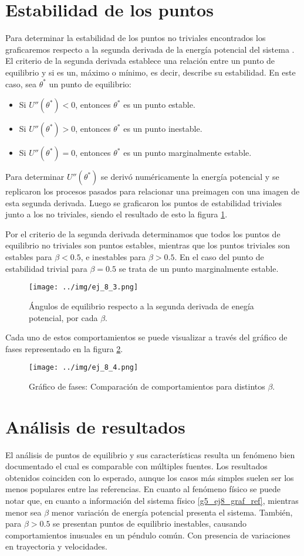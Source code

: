 \documentclass[../portafolio.tex]{subfiles}
\begin{document}
\section{Estabilidad de los puntos}
Para determinar la estabilidad de los puntos no triviales encontrados los graficaremos respecto a la segunda derivada de la energía potencial del sistema \citep{chasnov_diferenciales_2024}. 
El criterio de la segunda derivada establece una relación entre un punto de equilibrio y si es un, máximo o mínimo, es decir, describe su estabilidad. En este caso, sea $\theta^*$ un punto de equilibrio: 
\begin{itemize}
\item Si $U''(\theta^*)<0$, entonces $\theta^*$ es un punto estable. 
\item Si $U''(\theta^*)>0$, entonces $\theta^*$ es un punto inestable.
\item Si $U''(\theta^*)=0$, entonces $\theta^*$ es un punto marginalmente estable.
\end{itemize}
Para determinar $U''(\theta^*)$ se derivó numéricamente la energía potencial y se replicaron los procesos pasados para relacionar una preimagen con una imagen de esta segunda derivada.
Luego se graficaron los puntos de estabilidad triviales junto a los no triviales, siendo el resultado de esto la figura \ref{g5_ej8_graf3}.

Por el criterio de la segunda derivada determinamos que todos los puntos de equilibrio no triviales son puntos estables, mientras que los puntos triviales son estables para $\beta <0.5$, e inestables para $\beta > 0.5$. En el caso del punto de estabilidad trivial para $\beta =0.5$ se trata de un punto marginalmente estable.
\begin{figure}
\centering
\texttt{[image: ../img/ej\_8\_3.png]}
\caption{Ángulos de equilibrio respecto a la segunda derivada de enegía potencial, por cada $\beta$.} \label{g5_ej8_graf3}
\end{figure}
Cada uno de estos comportamientos se puede visualizar a través del gráfico de fases representado en la figura \ref{g5_ej8_graf4}.
\begin{figure}
\centering
\texttt{[image: ../img/ej\_8\_4.png]}
\caption{Gráfico de fases: Comparación de comportamientos para distintos $\beta$.} \label{g5_ej8_graf4}
\end{figure}
\section{Análisis de resultados}
El análisis de puntos de equilibrio y sus características resulta un fenómeno bien documentado el cual es comparable con múltiples fuentes. Los resultados obtenidos coinciden con lo esperado, aunque los casos más simples suelen ser los menos populares entre las referencias. 
En cuanto al fenómeno físico se puede notar que, en cuanto a información del sistema físico \ref{g5_ej8_graf_ref}, mientras menor sea $\beta$ menor variación de energía potencial presenta el sistema. También, para $\beta>0.5$ se presentan puntos de equilibrio inestables, causando comportamientos inusuales en un péndulo común. Con presencia de variaciones en trayectoria y velocidades.
\end{document}
